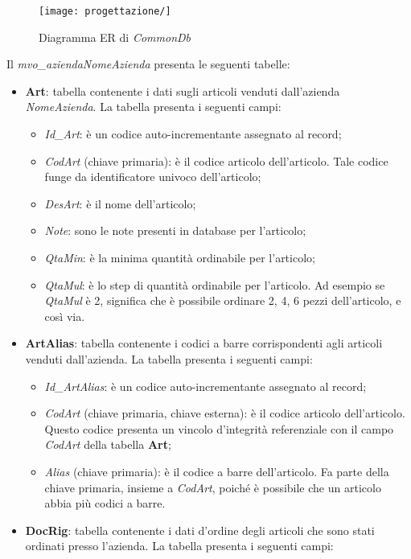 \begin{figure}[!h] 
    \centering 
    \texttt{[image: progettazione/]} 
    \caption{Diagramma ER di \textit{CommonDb}}
\end{figure}

Il \textit{mvo\_aziendaNomeAzienda} presenta le seguenti tabelle:
\begin{itemize}
	\item \textbf{Art}: tabella contenente i dati sugli articoli venduti dall'azienda \textit{NomeAzienda}. La tabella presenta i seguenti campi:
		\begin{itemize}
			\item \textit{Id\_Art}: è un codice auto-incrementante assegnato al record;
			\item \textit{CodArt} (chiave primaria): è il codice articolo dell'articolo. Tale codice funge da identificatore univoco dell'articolo;
			\item \textit{DesArt}: è il nome dell'articolo;
			\item \textit{Note}: sono le note presenti in database per l'articolo;
			\item \textit{QtaMin}: è la minima quantità ordinabile per l'articolo;
			\item \textit{QtaMul}: è lo step di quantità ordinabile per l'articolo. Ad esempio se \textit{QtaMul} è 2, significa che è possibile ordinare 2, 4, 6 pezzi dell'articolo, e così via.
		\end{itemize}
	\item \textbf{ArtAlias}: tabella contenente i codici a barre corrispondenti agli articoli venduti dall'azienda. La tabella presenta i seguenti campi:
		\begin{itemize}
			\item \textit{Id\_ArtAlias}: è un codice auto-incrementante assegnato al record;
			\item \textit{CodArt} (chiave primaria, chiave esterna): è il codice articolo dell'articolo. Questo codice presenta un vincolo d'integrità referenziale con il campo \textit{CodArt} della tabella \textbf{Art};
			\item \textit{Alias} (chiave primaria): è il codice a barre dell'articolo. Fa parte della chiave primaria, insieme a \textit{CodArt}, poiché è possibile che un articolo abbia più codici a barre.
		\end{itemize}
	\item \textbf{DocRig}: tabella contenente i dati d'ordine degli articoli che sono stati ordinati presso l'azienda. La tabella presenta i seguenti campi:

\end{itemize}
